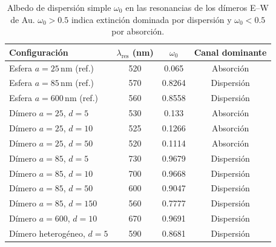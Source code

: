 \begin{table}[H]
  \centering
  \small
  \begin{tabular}{lccc}
    \hline
    Configuración & $\lambda_\text{res}$ (nm) & $\omega_0$ & Canal dominante \\
    \hline
    Esfera $a=25\,$nm (ref.)  & 520 & 0.065 & Absorción \\
    Esfera $a=85\,$nm (ref.)  & 570 & 0.8264 & Dispersión \\
    Esfera $a=600\,$nm (ref.) & 560 & 0.8558 & Dispersión \\
    \hline
    Dímero $a=25$, $d=5$           & 530        & 0.133  & Absorción \\
    Dímero $a=25$, $d=10$          & 525        & 0.1266 & Absorción \\
    Dímero $a=25$, $d=50$          & 520        & 0.1114 & Absorción \\
    \hline
    Dímero $a=85$, $d=5$           & 730        & 0.9679 & Dispersión \\
    Dímero $a=85$, $d=10$          & 700        & 0.9668 & Dispersión \\
    Dímero $a=85$, $d=50$          & 600        & 0.9047 & Dispersión \\
    Dímero $a=85$, $d=150$         & 560        & 0.7777 & Dispersión \\
    \hline
    Dímero $a=600$, $d=10$         & 670        & 0.9691 & Dispersión \\
    \hline
    Dímero heterogéneo, $d=5$      & 590        & 0.8681 & Dispersión \\
    \hline
  \end{tabular}
  \caption{Albedo de dispersión simple $\omega_0$ en las resonancias 
          de los dímeros E--W de Au.
           $\omega_0>0.5$ indica extinción dominada por dispersión y
           $\omega_0<0.5$ por absorción.}
  \label{tab:dimero_albedo}
\end{table}



